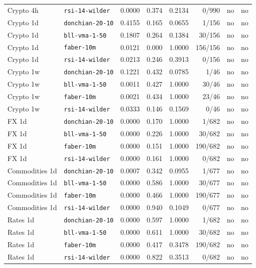 \begin{table}[t]
\begin{tabular}{llS[table-format=1.4]S[table-format=1.3]S[table-format=1.4]rcc}
Crypto 4h & \texttt{rsi-14-wilder} & 0.0000 & 0.374 & 0.2134 & 0/990 & no & no \\
Crypto 1d & \texttt{donchian-20-10} & 0.4155 & 0.165 & 0.0655 & 1/156 & no & no \\
Crypto 1d & \texttt{bll-vma-1-50} & 0.1807 & 0.264 & 0.1384 & 30/156 & no & no \\
Crypto 1d & \texttt{faber-10m} & 0.0121 & 0.000 & 1.0000 & 156/156 & no & no \\
Crypto 1d & \texttt{rsi-14-wilder} & 0.0213 & 0.246 & 0.3913 & 0/156 & no & no \\
Crypto 1w & \texttt{donchian-20-10} & 0.1221 & 0.432 & 0.0785 & 1/46 & no & no \\
Crypto 1w & \texttt{bll-vma-1-50} & 0.0011 & 0.427 & 1.0000 & 30/46 & no & no \\
Crypto 1w & \texttt{faber-10m} & 0.0021 & 0.434 & 1.0000 & 23/46 & no & no \\
Crypto 1w & \texttt{rsi-14-wilder} & 0.0333 & 0.146 & 0.1569 & 0/46 & no & no \\
FX 1d & \texttt{donchian-20-10} & 0.0000 & 0.170 & 1.0000 & 1/682 & no & no \\
FX 1d & \texttt{bll-vma-1-50} & 0.0000 & 0.226 & 1.0000 & 30/682 & no & no \\
FX 1d & \texttt{faber-10m} & 0.0000 & 0.151 & 1.0000 & 190/682 & no & no \\
FX 1d & \texttt{rsi-14-wilder} & 0.0000 & 0.161 & 1.0000 & 0/682 & no & no \\
Commodities 1d & \texttt{donchian-20-10} & 0.0007 & 0.342 & 0.0955 & 1/677 & no & no \\
Commodities 1d & \texttt{bll-vma-1-50} & 0.0000 & 0.586 & 1.0000 & 30/677 & no & no \\
Commodities 1d & \texttt{faber-10m} & 0.0000 & 0.466 & 1.0000 & 190/677 & no & no \\
Commodities 1d & \texttt{rsi-14-wilder} & 0.0000 & 0.940 & 0.1049 & 0/677 & no & no \\
Rates 1d & \texttt{donchian-20-10} & 0.0000 & 0.597 & 1.0000 & 1/682 & no & no \\
Rates 1d & \texttt{bll-vma-1-50} & 0.0000 & 0.611 & 1.0000 & 30/682 & no & no \\
Rates 1d & \texttt{faber-10m} & 0.0000 & 0.417 & 0.3478 & 190/682 & no & no \\
Rates 1d & \texttt{rsi-14-wilder} & 0.0000 & 0.822 & 0.3513 & 0/682 & no & no \\
\bottomrule
\end{tabular}
\end{table}

